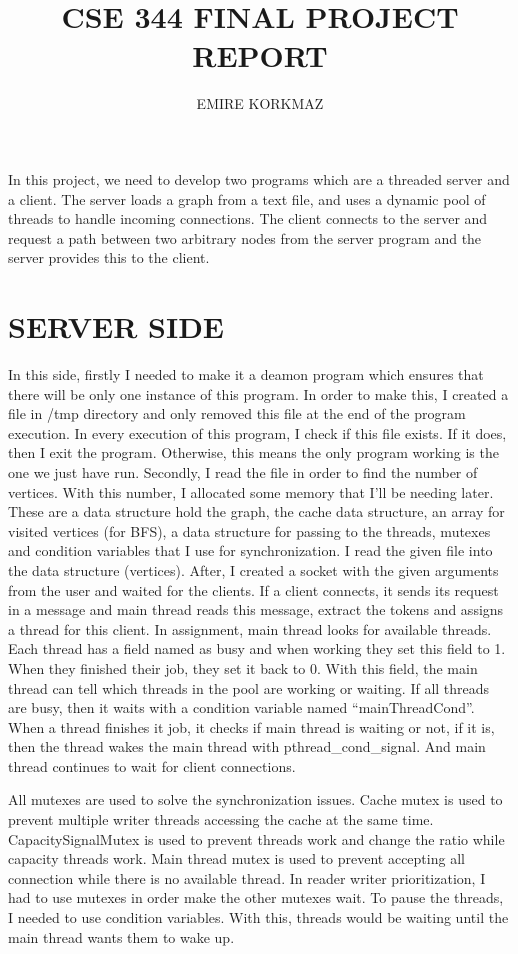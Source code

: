 \documentclass{article}
\title{CSE 344 FINAL PROJECT REPORT}
\author{EMIRE KORKMAZ\\
}
\begin{document}
\maketitle

In this project, we need to develop two programs which are a threaded server and a client. The server loads a graph from a text file, and uses a dynamic pool of threads to handle incoming connections. The client connects to the server and request a path between two arbitrary nodes from the server program and the server provides this to the client.
\bigbreak

\section{SERVER SIDE}


In this side, firstly I needed to make it a deamon program which ensures that there will be only one instance of this
program. In order to make this, I created a file in /tmp directory and only removed this file at the end of the program
execution. In every execution of this program, I check if this file exists. If it does, then I exit the program.
Otherwise, this means the only program working is the one we just have run.
Secondly, I read the file in order to find the number of vertices. With this number, I allocated some memory that I’ll
be needing later. These are a data structure hold the graph, the cache data structure, an array for visited vertices
(for BFS), a data structure for passing to the threads, mutexes and condition variables that I use for synchronization.
\bigbreak
I read the given file into the data structure (vertices). After, I created a socket with the given arguments from the
user and waited for the clients. If a client connects, it sends its request in a message and main thread reads this 
message, extract the tokens and assigns a thread for this client. In assignment, main thread looks for available 
threads. Each thread has a field named as busy and when working they set this field to 1. When they finished their job,
 they set it back to 0. With this field, the main thread can tell which threads in the pool  are working or waiting. If
  all threads are busy, then it waits with a condition variable named “mainThreadCond”. When a thread finishes it job, 
  it checks if main thread is waiting or not, if it is, then the thread wakes the main thread with pthread\_cond\_signal.
   And main thread continues to wait for client connections.
\bigbreak


All mutexes are used to solve the synchronization issues. Cache mutex is used to prevent multiple writer threads accessing the cache at the same time. CapacitySignalMutex is used to prevent threads work and change the ratio while capacity threads work. Main thread mutex is used to prevent accepting all connection while there is no available thread. In reader writer prioritization, I had to use mutexes in order make the other mutexes wait. To pause the threads, I needed to use condition variables. With this, threads would be waiting until the main thread wants them to wake up. 
\end{document}
